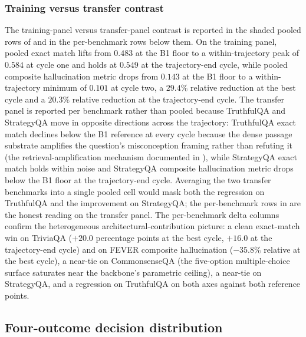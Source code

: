 

\FloatBarrier

\subsubsection{Training versus transfer contrast}
\label{sec:headline-id-vs-transfer}

The training-panel versus transfer-panel contrast is reported in the shaded pooled rows of  and in the per-benchmark rows below them. On the training panel, pooled exact match lifts from $0.483$ at the B1 floor to a within-trajectory peak of $0.584$ at cycle one and holds at $0.549$ at the trajectory-end cycle, while pooled composite hallucination metric drops from $0.143$ at the B1 floor to a within-trajectory minimum of $0.101$ at cycle two, a $29.4\%$ relative reduction at the best cycle and a $20.3\%$ relative reduction at the trajectory-end cycle. The transfer panel is reported per benchmark rather than pooled because TruthfulQA and StrategyQA move in opposite directions across the trajectory: TruthfulQA exact match declines below the B1 reference at every cycle because the dense passage substrate amplifies the question's misconception framing rather than refuting it (the retrieval-amplification mechanism documented in ), while StrategyQA exact match holds within noise and StrategyQA composite hallucination metric drops below the B1 floor at the trajectory-end cycle. Averaging the two transfer benchmarks into a single pooled cell would mask both the regression on TruthfulQA and the improvement on StrategyQA; the per-benchmark rows in  are the honest reading on the transfer panel. The per-benchmark delta columns confirm the heterogeneous architectural-contribution picture: a clean exact-match win on TriviaQA ($+20.0$ percentage points at the best cycle, $+16.0$ at the trajectory-end cycle) and on FEVER composite hallucination ($-35.8\%$ relative at the best cycle), a near-tie on CommonsenseQA (the five-option multiple-choice surface saturates near the backbone's parametric ceiling), a near-tie on StrategyQA, and a regression on TruthfulQA on both axes against both reference points.

\subsection{Four-outcome decision distribution}
\label{sec:decision-distribution}

